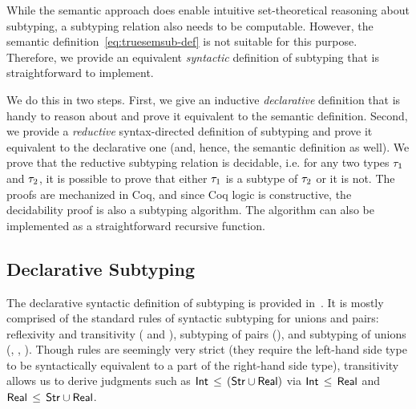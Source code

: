 While the semantic approach does enable intuitive set-theo\-re\-tical 
reasoning about subtyping,
a subtyping relation also needs to be computable.
However, the semantic definition~\eqref{eq:truesemsub-def}
is not suitable for this purpose.
Therefore, we provide an equivalent 
\emph{syntactic} definition of subtyping that is straightforward to implement.

We do this in two steps. 
First, we give an inductive \emph{declarative} definition
that is handy to reason about 
and prove it equivalent to the semantic definition.
Second, we provide a \emph{reductive} syntax-directed definition of subtyping
and prove it equivalent to the declarative one 
(and, hence, the semantic definition as well).
We prove that the reductive subtyping relation is decidable, 
i.e. for any two types $\tau_1$ and $\tau_2$,
it is possible to prove that either $\tau_1$ is a subtype of $\tau_2$ 
or it is not.
The proofs are mechanized in Coq, and since Coq logic is constructive,
the decidability proof is also a subtyping algorithm.
The algorithm can also be implemented as a straightforward recursive function.

\subsection{Declarative Subtyping}\label{sec:declsub}

The declarative syntactic definition of subtyping is provided in~.
It is mostly comprised of the standard rules
of syntactic subtyping for unions and pairs:
reflexivity and transitivity ( and ), 
subtyping of pairs (),
and subtyping of unions (, , ).
Though  rules are seemingly very strict 
(they require the left-hand side type to be syntactically equivalent
to a part of the right-hand side type), 
transitivity allows us to derive judgments such as
$\mathsf{Int} \, \leq \, (\mathsf{Str} \cup \mathsf{Real})$ via
$\mathsf{Int} \, \leq \, \mathsf{Real}$ and $\mathsf{Real} \, \leq \, \mathsf{Str} \cup \mathsf{Real}$.


